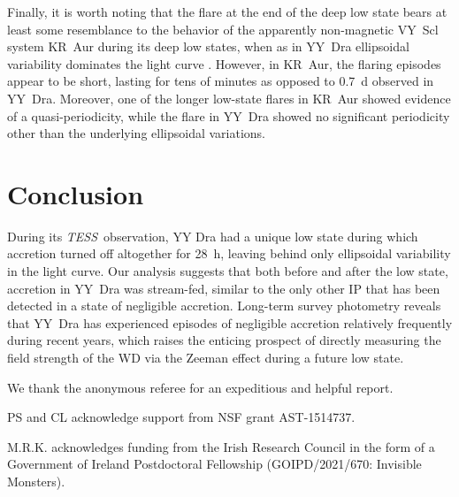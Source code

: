 \documentclass[twocolumn]{aastex63}
\newcommand{\TESS}{\textit{TESS}}
\begin{document}
Finally, it is worth noting that the flare at the end of the deep low state bears at least some resemblance to the behavior of the apparently non-magnetic VY~Scl system KR~Aur during its deep low states, when as in YY~Dra ellipsoidal variability dominates the light curve \citep{kr_aur}. However, in KR~Aur, the flaring episodes appear to be short, lasting for tens of minutes as opposed to 0.7~d observed in YY~Dra. Moreover, one of the longer low-state flares in  KR~Aur showed evidence of a quasi-periodicity, while the flare in YY~Dra showed no significant periodicity other than the underlying ellipsoidal variations. 

\section{Conclusion}

During its \TESS\ observation, YY Dra had a unique low state during which accretion turned off altogether for 28~h, leaving behind only ellipsoidal variability in the light curve. Our analysis suggests that both before and after the low state, accretion in YY~Dra was stream-fed, similar to the only other IP that has been detected in a state of negligible accretion. Long-term survey photometry reveals that YY~Dra has experienced episodes of negligible accretion relatively frequently during recent years, which raises the enticing prospect of directly measuring the field strength of the WD via the Zeeman effect during a future low state. 


\acknowledgements
We thank the anonymous referee for an expeditious and helpful report.

PS and CL acknowledge support from NSF grant AST-1514737.

M.R.K. acknowledges funding from the Irish Research Council in the form of a Government of Ireland Postdoctoral Fellowship (GOIPD/2021/670: Invisible Monsters).

\appendix
\end{document}
